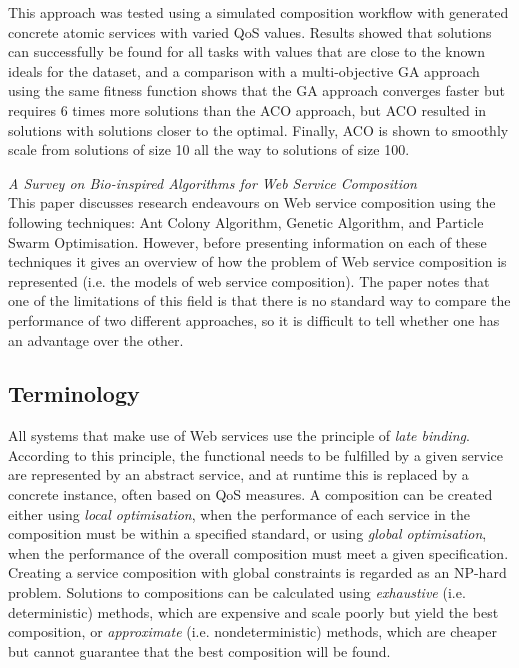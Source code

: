 This approach was tested using a simulated composition workflow with generated concrete atomic services with varied
QoS values. Results showed that solutions can successfully be found for all tasks with values that are close to the
known ideals for the dataset, and a comparison with a multi-objective GA approach using the same fitness function
shows that the GA approach converges faster but requires 6 times more solutions than the ACO approach, but ACO
resulted in solutions with solutions closer to the optimal. Finally, ACO is shown to smoothly scale from solutions
of size 10 all the way to solutions of size 100.

\textit{A Survey on Bio-inspired Algorithms for Web Service Composition \cite{wang2012survey}}\\
This paper discusses research endeavours on Web service composition using the following techniques:
Ant Colony Algorithm, Genetic Algorithm, and Particle Swarm Optimisation.
However, before presenting information on each of these techniques it gives an overview of how the
problem of Web service composition is represented (i.e. the models of web service composition).
The paper notes that one of the limitations of this field is that there is no standard way to compare
the performance of two different approaches, so it is difficult to tell whether one has an advantage
over the other.

\subsection{Terminology}
All systems that make use of Web services use the principle of \textit{late binding}. According to this
principle, the functional needs to be fulfilled by a given service are represented by an abstract service,
and at runtime this is replaced by a concrete instance, often based on QoS measures. A composition can be
created either using \textit{local optimisation}, when the performance of each service in the composition
must be within a specified standard, or using \textit{global optimisation}, when the performance of the
overall composition must meet a given specification.  Creating a service composition with global constraints
is regarded as an NP-hard problem. Solutions to compositions can be calculated using \textit{exhaustive}
(i.e. deterministic) methods, which are expensive and scale poorly but yield the best
composition, or \textit{approximate} (i.e. nondeterministic) methods, which are cheaper but cannot
guarantee that the best composition will be found.

